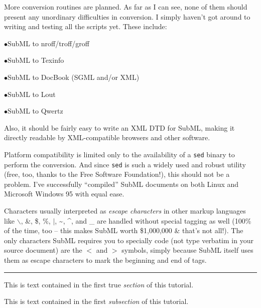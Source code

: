 More conversion routines are planned.  As far as I can see, none of them should present any unordinary difficulties in conversion.  I simply haven't got around to writing and testing all the scripts yet.  These include:
 

\medskip 
\item{$\bullet$}SubML to nroff/troff/groff
\item{$\bullet$}SubML to Texinfo
\item{$\bullet$}SubML to DocBook (SGML and/or XML)
\item{$\bullet$}SubML to Lout
\item{$\bullet$}SubML to Qwertz
\medskip 
 

Also, it should be fairly easy to write an XML DTD for SubML, making it directly readable by XML-compatible browsers and other software.
 

 

Platform compatibility is limited only to the availability of a {\tt sed} binary to perform the conversion.  And since {\tt sed} is such a widely used and robust utility (free, too, thanks to the Free Software Foundation!), this should not be a problem.  I've successfully ``compiled'' SubML documents on both Linux and Microsoft Windows 95 with equal ease.
 

 

Characters usually interpreted as {\it escape characters} in other markup languages like $\backslash$, \&, \$, \%, $|$, \~{}, \^{}, and \_{} are handled without special tagging as well (100\% of the time, too -- this makes SubML worth \$1,000,000 \& that's not all!).  The only characters SubML requires you to specially code (not type verbatim in your source document) are the $<$ and $>$ symbols, simply because SubML itself uses them as escape characters to mark the beginning and end of tags. 
 


\vfil \eject 
\bigskip \hrule \bigskip 
\noindent {} \bigskip 
 

This is text contained in the first true {\it section} of this tutorial.
 


\bigskip \noindent {} \medskip 
 

This is text contained in the first {\it subsection} of this tutorial.
 



\bigskip \noindent {} \medskip 
 

